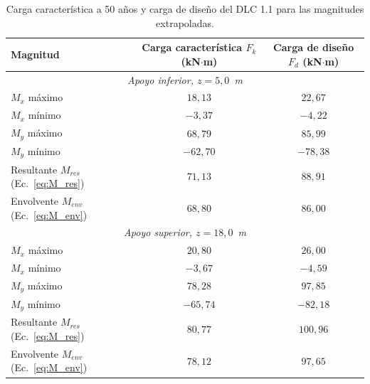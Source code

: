 \begin{table}[H]
    \centering
    \caption[Cargas características y de diseño del DLC 1.1.]{Carga característica a 50 años y carga de diseño del DLC 1.1 para las magnitudes extrapoladas.}
    \label{tab:dlc11_magnitudes}
    \begin{tabular}{lcc}
        \hline
        \textbf{Magnitud} & \textbf{Carga característica} $F_k$ (kN$\cdot$m) & \textbf{Carga de diseño} $F_d$ (kN$\cdot$m) \\
        \hline
        \multicolumn{3}{c}{\textit{Apoyo inferior, $z = 5{,}0$~m}} \\
        \hline
        $M_x$ máximo & $18{,}13$ & $22{,}67$ \\
        $M_x$ mínimo & $-3{,}37$ & $-4{,}22$ \\
        $M_y$ máximo & $68{,}79$ & $85{,}99$ \\
        $M_y$ mínimo & $-62{,}70$ & $-78{,}38$ \\
        Resultante $M_{res}$ (Ec.~\ref{eq:M_res}) & $71{,}13$ & $88{,}91$ \\
        Envolvente $M_{env}$ (Ec.~\ref{eq:M_env}) & $68{,}80$ & $86{,}00$ \\
        \hline
        \multicolumn{3}{c}{\textit{Apoyo superior, $z = 18{,}0$~m}} \\
        \hline
        $M_x$ máximo & $20{,}80$ & $26{,}00$ \\
        $M_x$ mínimo & $-3{,}67$ & $-4{,}59$ \\
        $M_y$ máximo & $78{,}28$ & $97{,}85$ \\
        $M_y$ mínimo & $-65{,}74$ & $-82{,}18$ \\
        Resultante $M_{res}$ (Ec.~\ref{eq:M_res}) & $80{,}77$ & $100{,}96$ \\
        Envolvente $M_{env}$ (Ec.~\ref{eq:M_env}) & $78{,}12$ & $97{,}65$ \\
        \hline
    \end{tabular}
\end{table}

